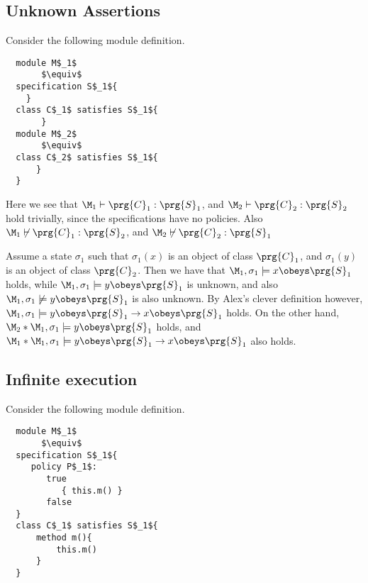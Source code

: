 \section{}
\label{examples}

\subsection{Unknown Assertions}
\label{problems:undefinedAssert}
Consider the following module definition.

 \begin{lstlisting}
  module M$_1$
       $\equiv$
  specification S$_1${
    }
  class C$_1$ satisfies S$_1${
       }
  module M$_2$
       $\equiv$
  class C$_2$ satisfies S$_1${
      }
  }
\end{lstlisting}

Here we see that $\M_1 \vdash \prg{C}_1 : \prg{S}_1$, and $\M_2 \vdash \prg{C}_2 : \prg{S}_2$
 hold trivially, since the specifications have no policies. 
 Also $\M_1 \not\vdash \prg{C}_1 : \prg{S}_2$, and $\M_2 \not\vdash \prg{C}_2 : \prg{S}_1$


Assume a state $\sigma_1$ such that $\sigma_1(x)$ is an object of class $\prg{C}_1$, 
and $\sigma_1(y)$ is an object of class $\prg{C}_2$.
Then we have that $\M_1, \sigma_1 \models x \obeys \prg{S}_1$ holds, 
while $\M_1, \sigma_1 \models y \obeys \prg{S}_1$ is unknown, and also
$\M_1, \sigma_1 \not\models y \obeys \prg{S}_1$ is also unknown. 
By Alex's clever definition however,  $\M_1, \sigma_1 \models y \obeys \prg{S}_1 \rightarrow  x \obeys \prg{S}_1$ holds.
On the other hand, $\M_2*\M_1, \sigma_1 \models y \obeys \prg{S}_1$ holds, 
and $\M_1*\M_1, \sigma_1 \models y \obeys \prg{S}_1 \rightarrow  x \obeys \prg{S}_1$ also holds.


\subsection{Infinite execution}

Consider the following module definition.

 \begin{lstlisting}
  module M$_1$
       $\equiv$
  specification S$_1${
     policy P$_1$:
        true
           { this.m() }
        false
  }
  class C$_1$ satisfies S$_1${
      method m(){
          this.m()
      }
  }
\end{lstlisting}


